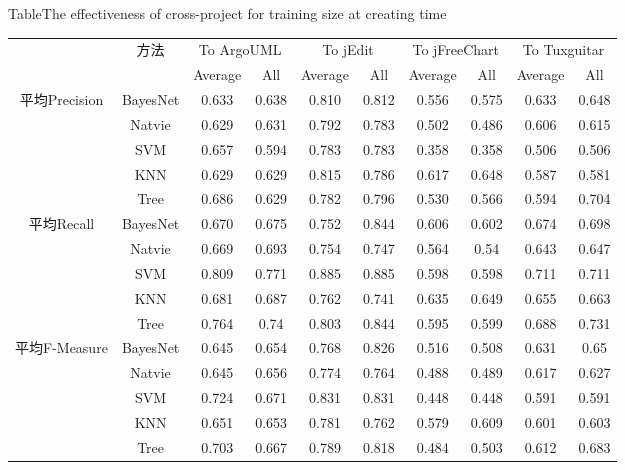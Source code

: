 \begin{table} [htbp]
{Table$\!$}{The effectiveness of cross-project for training size at creating time}
\vspace{0.5em}
\centering
\footnotesize
\begin{tabular}{cccccccccc}
\toprule[1.5pt]
~\multirow{2}{*}{指标}&\multirow{2}{*}{方法}&\multicolumn{2}{c}{To ArgoUML}&\multicolumn{2}{c}{To jEdit}&\multicolumn{2}{c}{To jFreeChart}&\multicolumn{2}{c}{To  Tuxguitar}\\
\cline{3-10}
~&~&{Average}&{All}&{Average}&{All}&{Average}&{All}&{Average}&{All}\\
\midrule[1pt]
\multirow{5}{*}{平均Precision}
&BayesNet&0.633&0.638&0.810&	0.812&0.556&0.575&0.633&0.648\\
&Natvie&0.629&0.631&0.792&0.783&0.502&0.486&	0.606&0.615\\
&SVM&0.657&0.594&0.783&0.783&	0.358&0.358&0.506&	0.506\\
&KNN&0.629&0.629&0.815&0.786&	0.617&0.648&0.587&	0.581\\
&Tree&0.686&	0.629&0.782&0.796&	0.530&0.566&0.594&0.704\\
\hline
\multirow{5}{*}{平均Recall}															
&BayesNet&0.670&0.675&	0.752&0.844&	0.606&0.602&	0.674&0.698\\
&Natvie&0.669&0.693&	0.754&0.747&	0.564&0.54&0.643&0.647\\
&SVM&	0.809&0.771&0.885&	0.885&0.598&0.598&0.711&0.711\\
&KNN&	0.681&0.687&0.762&0.741&0.635&0.649&0.655&	0.663\\
&Tree	&0.764&	0.74&	0.803&0.844&0.595&	0.599&0.688&0.731\\
\hline
\multirow{5}{*}{平均F-Measure}					
&BayesNet&0.645&0.654&	0.768&0.826&0.516&0.508&0.631&0.65\\
&Natvie&0.645&0.656&	0.774&0.764	&0.488&	0.489	&0.617&0.627\\
&SVM&	0.724&0.671&0.831&	0.831&0.448&0.448&	0.591&0.591\\
&KNN&	0.651&0.653&0.781&	0.762&0.579	&0.609&	0.601	&0.603\\
&Tree	&0.703&	0.667&0.789&0.818&	0.484	&0.503&	0.612	&0.683\\
\bottomrule[1.5pt]
\end{tabular}
\end{table}


